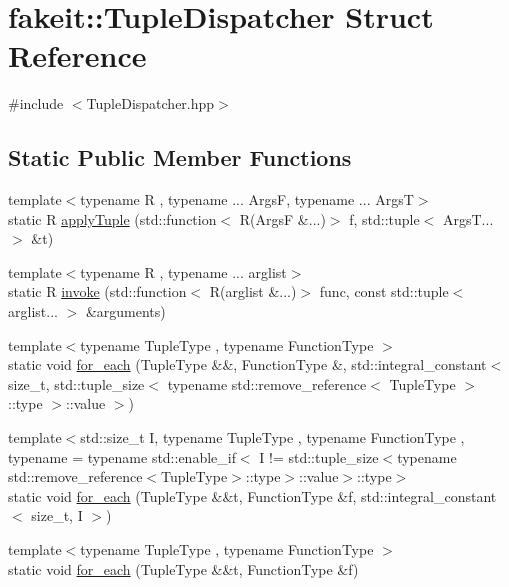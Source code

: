 \hypertarget{structfakeit_1_1TupleDispatcher}{}\section{fakeit\+::Tuple\+Dispatcher Struct Reference}
\label{structfakeit_1_1TupleDispatcher}


{\ttfamily \#include $<$Tuple\+Dispatcher.\+hpp$>$}

\subsection*{Static Public Member Functions}
\begin{DoxyCompactItemize}
\item 
{\footnotesize template$<$typename R , typename ... ArgsF, typename ... ArgsT$>$ }\\static R \mbox{\hyperlink{structfakeit_1_1TupleDispatcher_ac57ede994f304c03e3982e6fa4d1ca41}{apply\+Tuple}} (std\+::function$<$ R(ArgsF \&...)$>$ f, std\+::tuple$<$ Args\+T... $>$ \&t)
\item 
{\footnotesize template$<$typename R , typename ... arglist$>$ }\\static R \mbox{\hyperlink{structfakeit_1_1TupleDispatcher_a279619fd6d6649c4d99c459a3286469a}{invoke}} (std\+::function$<$ R(arglist \&...)$>$ func, const std\+::tuple$<$ arglist... $>$ \&arguments)
\item 
{\footnotesize template$<$typename Tuple\+Type , typename Function\+Type $>$ }\\static void \mbox{\hyperlink{structfakeit_1_1TupleDispatcher_af22c1fae8c695f722da986df9af411ca}{for\+\_\+each}} (Tuple\+Type \&\&, Function\+Type \&, std\+::integral\+\_\+constant$<$ size\+\_\+t, std\+::tuple\+\_\+size$<$ typename std\+::remove\+\_\+reference$<$ Tuple\+Type $>$\+::type $>$\+::value $>$)
\item 
{\footnotesize template$<$std\+::size\+\_\+t I, typename Tuple\+Type , typename Function\+Type , typename  = typename std\+::enable\+\_\+if$<$            I != std\+::tuple\+\_\+size$<$typename std\+::remove\+\_\+reference$<$\+Tuple\+Type$>$\+::type$>$\+::value$>$\+::type$>$ }\\static void \mbox{\hyperlink{structfakeit_1_1TupleDispatcher_afd32e025fbf695e16bb4b4ac1642c491}{for\+\_\+each}} (Tuple\+Type \&\&t, Function\+Type \&f, std\+::integral\+\_\+constant$<$ size\+\_\+t, I $>$)
\item 
{\footnotesize template$<$typename Tuple\+Type , typename Function\+Type $>$ }\\static void \mbox{\hyperlink{structfakeit_1_1TupleDispatcher_a8fd292a71795aae0aba215dad28ee4c2}{for\+\_\+each}} (Tuple\+Type \&\&t, Function\+Type \&f)

\end{DoxyCompactItemize}
